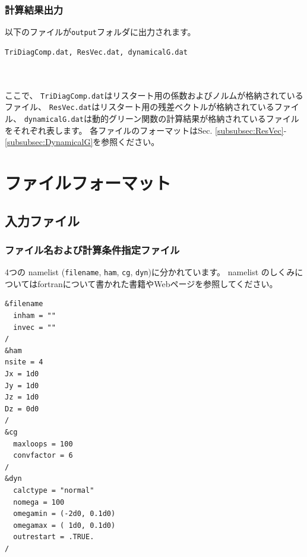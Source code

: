 \documentclass[12pt,titlepage]{jarticle}
\begin{document}
\subsubsection*{計算結果出力}
以下のファイルが\verb|output|フォルダに出力されます。
\\
\begin{minipage}{11cm}
\begin{screen}
\begin{verbatim}
TriDiagComp.dat, ResVec.dat, dynamicalG.dat
\end{verbatim}
\end{screen}
\end{minipage}
\\ \\
ここで、
\verb|TriDiagComp.dat|はリスタート用の係数およびノルムが格納されているファイル、
\verb|ResVec.dat|はリスタート用の残差ベクトルが格納されているファイル、
\verb|dynamicalG.dat|は動的グリーン関数の計算結果が格納されているファイルをそれぞれ表します。
各ファイルのフォーマットはSec. \ref{subsubsec:ResVec}-\ref{subsubsec:DynamicalG}を参照ください。

\newpage
\section{ファイルフォーマット}\label{Sec:FileFormat}

\subsection{入力ファイル}

\subsubsection{ファイル名および計算条件指定ファイル}\label{Sec:ModPara}
4つの namelist (\verb|filename|, \verb|ham|, \verb|cg|, \verb|dyn|)に分かれています。
namelist のしくみについてはfortranについて書かれた書籍やWebページを参照してください。
\\
\begin{minipage}{15cm}
\begin{screen}
\begin{verbatim}
&filename
  inham = ""
  invec = ""
/
&ham
nsite = 4
Jx = 1d0
Jy = 1d0
Jz = 1d0
Dz = 0d0
/
&cg
  maxloops = 100
  convfactor = 6
/
&dyn
  calctype = "normal"
  nomega = 100
  omegamin = (-2d0, 0.1d0)
  omegamax = ( 1d0, 0.1d0)
  outrestart = .TRUE.
/
\end{verbatim}
\end{screen}
\end{minipage}
\\
\end{document}
